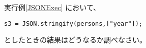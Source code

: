 \begin{Prob}\upshape
 実行例\else\ref{JSONExec}\fi
 において、
\begin{Verbatim}
s3 = JSON.stringify(persons,["year"]);
\end{Verbatim}
としたときの結果はどうなるか調べなさい。
\end{Prob}
